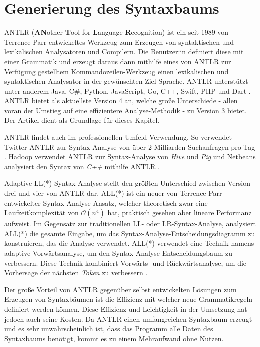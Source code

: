 \chapter{Generierung des Syntaxbaums}
\label{cha:antlr}

ANTLR (\textbf{AN}other \textbf{T}ool for \textbf{L}anguage \textbf{R}ecognition) ist ein seit 1989 von Terrence Parr entwickeltes Werkzeug zum Erzeugen von syntaktischen und lexikalischen Analysatoren und Compilern. Die Benutzer:in definiert diese mit einer Grammatik und erzeugt daraus dann mithilfe eines von ANTLR zur Verfügung gestelltem Kommandozeilen-Werkzeug einen lexikalischen und syntaktischen Analysator in der gewünschten Ziel-Sprache. ANTLR unterstützt unter anderem Java, C\#, Python, JavaScript, Go, C++, Swift, PHP und Dart \parencite{antlrtargets}. ANTLR bietet als aktuellste Version 4 an, welche große Unterschiede - allen voran der Umstieg auf eine effizientere Analyse-Methodik - zu Version 3 bietet. Der Artikel \textcite{antlrMegaTutorial} dient als Grundlage für dieses Kapitel.

ANTLR findet auch im professionellen Umfeld Verwendung. So verwendet Twitter ANTLR zur Syntax-Analyse von über 2 Milliarden Suchanfragen pro Tag \parencite{antlrWebsite}. Hadoop verwendet ANTLR zur Syntax-Analyse von \textit{Hive} und \textit{Pig} und Netbeans analysiert den Syntax von \textit{C++} mithilfe ANTLR \parencite{antlrabout}.

Adaptive LL(*) Syntax-Analyse stellt den größten Unterschied zwischen Version drei und vier von ANTLR dar. ALL(*) ist ein neuer von Terrence Parr entwickelter Syntax-Analyse-Ansatz, welcher theoretisch zwar eine Laufzeitkomplexität von $\mathcal{O}(n^4)$ hat, praktisch gesehen aber lineare Performanz aufweist. Im Gegensatz zur traditionellen LL- oder LR-Syntax-Analyse, analysiert ALL(*) die gesamte Eingabe, um das Syntax-Analyse-Entscheidungsdiagramm zu konstruieren, das die Analyse verwendet. ALL(*) verwendet eine Technik namens adaptive Vorwärtsanalyse, um den Syntax-Analyse-Entscheidungsbaum zu verbessern. Diese Technik kombiniert Vorwärts- und Rückwärtsanalyse, um die Vorhersage der nächsten \textit{Token} zu verbessern \parencite{parr2014adaptive}.

Der große Vorteil von ANTLR gegenüber selbst entwickelten Lösungen zum Erzeugen von Syntaxbäumen ist die Effizienz mit welcher neue Grammatikregeln definiert werden können. Diese Effizienz und Leichtigkeit in der Umsetzung hat jedoch auch seine Kosten. Da ANTLR einen umfangreichen Syntaxbaum erzeugt und es sehr unwahrscheinlich ist, dass das Programm alle Daten des Syntaxbaums benötigt, kommt es zu einem Mehraufwand ohne Nutzen.

